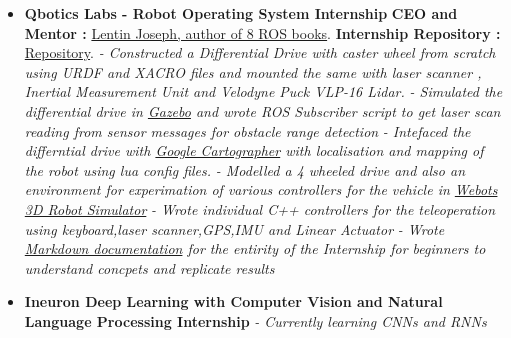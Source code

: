 \documentclass[a4paper,12pt]{article}
\begin{document}
\begin{itemize}
    \item{\textbf{\large{Qbotics Labs - Robot Operating System Internship}}
          \newline
          \textbf{ CEO and Mentor :} \href{https://in.linkedin.com/in/lentinjoseph}{Lentin Joseph, author of 8 ROS books}.
          \newline
          \textbf{ Internship Repository :} \href{https://github.com/teetangh/Qbotics-Labs-Internship-Differential-Drives}{Repository}.
          \newline
          \textit{- Constructed a Differential Drive with caster wheel from scratch using URDF and XACRO files and mounted the same with laser scanner , Inertial Measurement Unit and Velodyne Puck VLP-16 Lidar. }
          \newline
          \textit{- Simulated the differential drive in \underline{Gazebo} and wrote ROS Subscriber script to get laser scan reading from sensor messages for obstacle range detection }
          \newline
          \textit{- Intefaced the differntial drive with \underline{Google Cartographer} with localisation and mapping of the robot using lua config files. }
          \newline
          \textit{- Modelled a 4 wheeled drive and also an environment for experimation of various controllers for the vehicle in \underline{Webots 3D Robot Simulator}}
          \newline
          \textit{- Wrote individual C++ controllers for the teleoperation using keyboard,laser scanner,GPS,IMU and Linear Actuator}
          \newline
          \textit{- Wrote \underline{Markdown documentation} for the entirity of the Internship for beginners to understand concpets and replicate results}}
\end{itemize}
\begin{itemize}
    \item{\textbf{\large{Ineuron Deep Learning with Computer Vision and Natural Language Processing Internship}}
          \newline
          \textit{- Currently learning CNNs and RNNs }}
\end{itemize}

\end{document}
